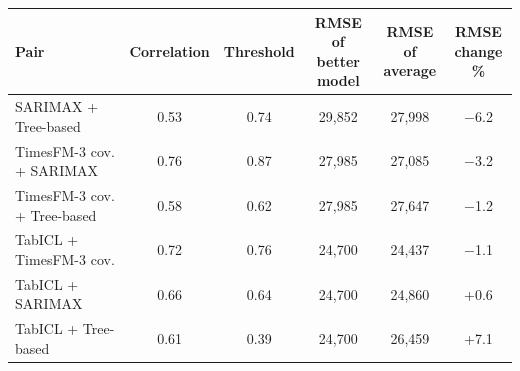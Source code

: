 \setlength{\tabcolsep}{3pt}
\begin{tabular}{lccccc}
\toprule
Pair & Correlation & Threshold & \shortstack{RMSE of\\better model} & \shortstack{RMSE of\\average} & \shortstack{RMSE\\change \%} \\
\midrule
SARIMAX + Tree-based & 0.53 & 0.74 & 29,852 & 27,998 & $-$6.2 \\
TimesFM-3 cov. + SARIMAX & 0.76 & 0.87 & 27,985 & 27,085 & $-$3.2 \\
TimesFM-3 cov. + Tree-based & 0.58 & 0.62 & 27,985 & 27,647 & $-$1.2 \\
TabICL + TimesFM-3 cov. & 0.72 & 0.76 & 24,700 & 24,437 & $-$1.1 \\
TabICL + SARIMAX & 0.66 & 0.64 & 24,700 & 24,860 & +0.6 \\
TabICL + Tree-based & 0.61 & 0.39 & 24,700 & 26,459 & +7.1 \\
\bottomrule
\end{tabular}
